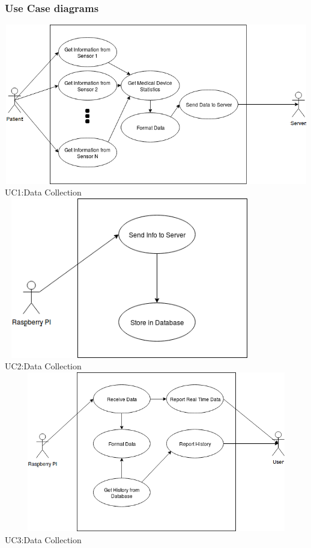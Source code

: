 \subsubsection{Use Case diagrams}

\begin{center}

\includegraphics[width=15cm, height=7cm]{Diagrams/UseCase1.png}
UC1:Data Collection
\\

\includegraphics[width=11cm, height=7cm]{Diagrams/UseCase2.png}
\\
UC2:Data Collection
\\

\includegraphics[width=15cm, height=7cm]{Diagrams/UseCase3.png}
UC3:Data Collection
\\


\end{center}
